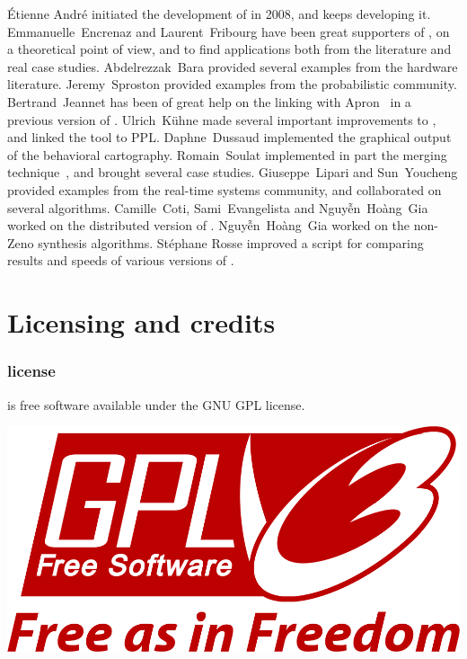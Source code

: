 \sloppy
\'Etienne André initiated the development of \imitator{} in 2008, and keeps developing it.
Emmanuelle~Encrenaz and Laurent~Fribourg have been great supporters of \imitator{}, on a theoretical point of view, and to find applications both from the literature and real case studies.
Abdelrezzak~Bara provided several examples from the hardware literature.
Jeremy~Sproston provided examples from the probabilistic community.
Bertrand~Jeannet has been of great help on the linking with Apron~\cite{JM09} in a previous version of \imitator{}.
Ulrich~K\"uhne made several important improvements to \imitator{}, and linked the tool to PPL.
Daphne~Dussaud implemented the graphical output of the behavioral cartography.
Romain~Soulat implemented in part the merging technique~\cite{AFS13atva}, and brought several case studies.
Giuseppe~Lipari and Sun~Youcheng provided examples from the real-time systems community, and collaborated on several algorithms.
Camille~Coti, Sami~Evangelista and Nguy\~{ê}n~Hoàng~Gia worked on the distributed version of \imitator{}.
Nguy\~{ê}n~Hoàng~Gia worked on the non-Zeno synthesis algorithms.
%
Stéphane Rosse improved a script for comparing results and speeds of various versions of \imitator{}.



\chapter{Licensing and credits}

\subsection*{\imitator{} license}
\imitator{} is free software available under the GNU GPL license.

\begin{center}
	\includegraphics[width=.3\textwidth]{images/GPLv3_Logo.png}
\end{center}

\bigskip

